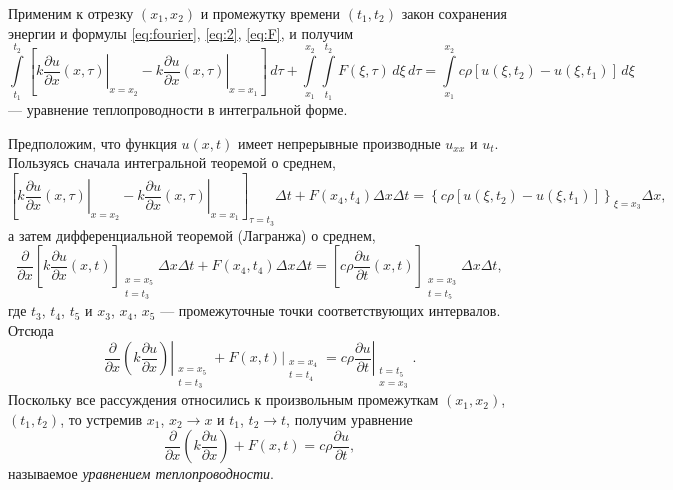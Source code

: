 Применим к отрезку $ (x_1, x_2) $ и промежутку времени $ (t_1, t_2) $ закон
сохранения энергии и формулы \eqref{eq:fourier}, \eqref{eq:2}, \eqref{eq:F}, и
получим 
\[
 \int\limits_{t_1}^{t_2} \left[\left. k \frac{\partial u}{\partial
   x}(x,\tau)\right|_{x=x_2} -\left. k \frac{\partial u}{\partial x}(x,
   \tau)\right|_{x=x_1} \right] \,d\tau
   +\int\limits_{x_1}^{x_2}\int\limits_{t_1}^{t_2} F(\xi, \tau)\,d\xi\,d\tau =
     \int\limits_{x_1}^{x_2}c\rho[u(\xi, t_2) - u(\xi, t_1)]\,d\xi
\]
--- уравнение теплопроводности в интегральной форме.

Предположим, что функция
$ u(x, t) $ имеет непрерывные производные $ u_{xx} $ и $ u_t $.
Пользуясь сначала интегральной теоремой о среднем, 
\[
  \left[ \left. k \frac{\partial u}{\partial x}(x,\tau) \right|_{x=x_2} -\left.
        k \frac{\partial u}{\partial x}(x,
      \tau)\right|_{x=x_1}  \right]_{\tau=t_3}\Delta t + F(x_4, t_4) \Delta x
      \Delta t = 
      \left\{ c\rho [u(\xi, t_2) - u(\xi, t_1)] \right\}_{\xi = x_3} \Delta x,
\]
а затем дифференциальной теоремой (Лагранжа) о среднем, 
\[
    \frac{\partial}{\partial x} \left[ k \frac{\partial u}{\partial x}(x, t)
    \right]_{\substack{x = x_5 \\ t = t_3}} \Delta x \Delta t + F(x_4, t_4)\Delta x \Delta
    t = \left[ c\rho \frac{\partial u}{\partial t}(x, t)
    \right]_{\substack{x=x_3\\t=t_5}}\Delta x \Delta t,
\]
где $ t_3$, $t_4$, $t_5 $ и $ x_3 $, $ x_4 $, $ x_5 $ --- промежуточные точки
соответствующих интервалов.
Отсюда  
\[
    \frac{\partial }{\partial x} \left.\left( k \frac{\partial u}{\partial x}
        \right)\right|_{\substack{x=x_5 \\ t=t_3}} + \left.F(x,
          t)\right|_{\substack{x=x_4\\t=t_4}} =
          \left. c\rho \frac{\partial u}{\partial t}\right|_{\substack{t=t_5 \\
            x= x_3}}.
\]
Поскольку все рассуждения относились к произвольным промежуткам $ (x_1, x_2) $,
$ (t_1, t_2) $, то устремив $ x_1 $, $ x_2  \to x$ и $ t_1 $, $ t_2 \to t $,
получим уравнение  
\[
    \boxed{\frac{\partial }{\partial x} \left( k \frac{\partial u}{\partial x} \right)
    + F(x, t) = c\rho \frac{\partial u}{\partial t},}
\]
называемое \emph{уравнением теплопроводности}. 

